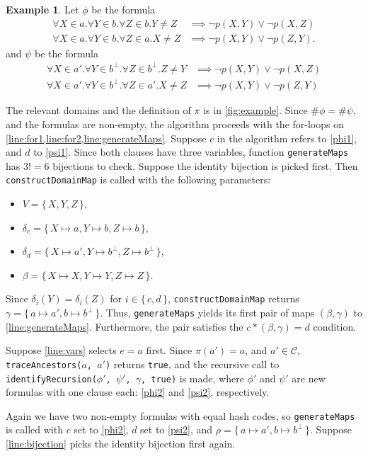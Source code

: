 \documentclass{article}
\theoremstyle{definition}
\newtheorem{example}{Example}
\begin{document}
\begin{example} \label{example}
  Let $\phi$ be the formula
  \begin{align}
    \forall X \in a. \forall Y \in b. \forall Z \in b. Y \ne Z &\implies \neg p(X, Y) \lor \neg p(X, Z)\label{phi1} \\
    \forall X \in a. \forall Y \in b. \forall Z \in a. X \ne Z &\implies \neg p(X, Y) \lor \neg p(Z, Y).\label{phi2}
  \end{align}
  and $\psi$ be the formula
  \begin{align}
    \forall X \in a'. \forall Y \in b^\bot. \forall Z \in b^\bot. Z \ne Y &\implies \neg p(X, Y) \lor \neg p(X, Z)\label{psi1} \\
    \forall X \in a'. \forall Y \in b^\bot. \forall Z \in a'. X \ne Z &\implies \neg p(X, Y) \lor \neg p(Z, Y)\label{psi2}
  \end{align}

  The relevant domains and the definition of $\pi$ is in \cref{fig:example}. Since $\#\phi = \#\psi$, and the formulas are non-empty, the algorithm proceeds with the for-loops on \cref{line:for1,line:for2,line:generateMaps}. Suppose $c$ in the algorithm refers to \cref{phi1}, and $d$ to \cref{psi1}. Since both clauses have three variables, function \texttt{generateMaps} has $3!=6$ bijections to check. Suppose the identity bijection is picked first. Then \texttt{constructDomainMap} is called with the following parameters:
  \begin{itemize}
  \item $V = \{\, X, Y, Z \,\}$,
  \item $\delta_c = \{\, X \mapsto a, Y \mapsto b, Z \mapsto b \,\}$,
  \item $\delta_d = \{\, X \mapsto a', Y \mapsto b^\bot, Z \mapsto b^\bot \,\}$,
  \item $\beta = \{\, X \mapsto X, Y \mapsto Y, Z \mapsto Z \,\}$.
  \end{itemize}
  Since $\delta_i(Y) = \delta_i(Z)$ for $i \in \{\, c, d \,\}$, \texttt{constructDomainMap} returns $\gamma = \{\, a \mapsto a', b \mapsto b^\bot \,\}$. Thus, \texttt{generateMaps} yields its first pair of maps $(\beta, \gamma)$ to \cref{line:generateMaps}. Furthermore, the pair satisfies the $c \ast (\beta, \gamma) = d$ condition.

  Suppose \cref{line:vars} selects $e = a$ first. Since $\pi(a') = a$, and $a' \in \mathscr{C}$, \texttt{traceAncestors($a$, $a'$)} returns \texttt{true}, and the recursive call to \texttt{identifyRecursion($\phi'$, $\psi'$, $\gamma$, true)} is made, where $\phi'$ and $\psi'$ are new formulas with one clause each: \cref{phi2} and \cref{psi2}, respectively.

  Again we have two non-empty formulas with equal hash codes, so \texttt{generateMaps} is called with $c$ set to \cref{phi2}, $d$ set to \cref{psi2}, and $\rho = \{\, a \mapsto a', b \mapsto b^\bot \,\}$. Suppose \cref{line:bijection} picks the identity bijection first again.

\end{example}
\end{document}
